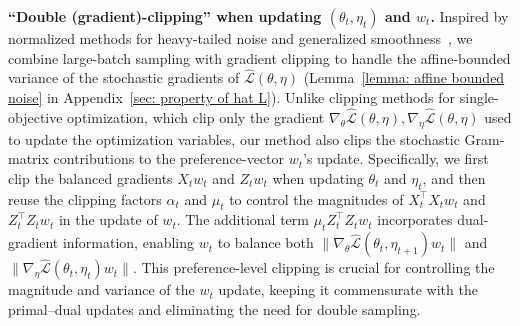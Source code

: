 \documentclass[twoside]{article} %
\theoremstyle{plain}
\theoremstyle{definition}
\theoremstyle{remark}
\newcommand{\hL}{\hat{L}}
\newcommand{\fhL}{\hat{\mathcal{L}}}
\begin{document}
\begin{itemize}[leftmargin = *, topsep = 0pt]
\textbf{``Double (gradient)-clipping'' when updating $(\theta_t,\eta_t)$ and $w_t$.}
Inspired by normalized methods for heavy-tailed noise and generalized
smoothness~\citep{jinnonconvexdro,generalizedsmooth,whyadamisgood}, we combine
large-batch sampling with gradient clipping to handle the affine-bounded
variance of the stochastic gradients of $\fhL(\theta,\eta)$
(Lemma~\ref{lemma: affine bounded noise} in
Appendix~\ref{sec: property of hat L}). Unlike clipping methods for single-objective optimization, which clip only the gradient \(\nabla_{\theta}\fhL(\theta,\eta),\nabla_{\eta} \fhL(\theta,\eta)\) used to update the optimization variables, our method also clips the stochastic Gram-matrix contributions to the preference-vector $w_t$'s update. Specifically, we first clip the balanced gradients \(X_tw_t\) and \(Z_tw_t\) when updating \(\theta_t\) and \(\eta_t\), and then reuse the clipping factors \(\alpha_t\) and \(\mu_t\) to control the magnitudes of \(X_t^\top X_tw_t\) and \(Z_t^\top Z_tw_t\) in the update of \(w_t\). The additional term \(\mu_tZ_t^\top Z_tw_t\) incorporates dual-gradient information, enabling \(w_t\) to balance both \(\|\nabla_{\theta}\fhL(\theta_t,\eta_{t+1})w_t\|\) and \(\|\nabla_{\eta}\fhL(\theta_t,\eta_t)w_t\|\). This preference-level clipping is crucial for controlling the magnitude and variance of the \(w_t\) update, keeping it commensurate with the primal–dual updates and eliminating the need for double sampling.

\end{itemize}
\end{document}
